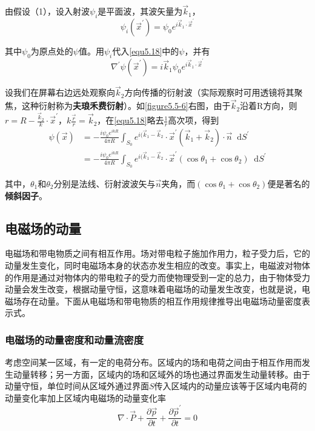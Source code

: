\documentclass[UTF8]{ctexart}
\newcommand*{\dif}{\mathop{}\!\mathrm{d}}
\begin{document}
    由假设（1），设入射波$\psi_i$是平面波，其波矢量为$\vec{k}_1$，
    \begin{equation}
        \psi_i(\vec{x}^{\prime}) = \psi_0 e^{i\vec{k}_1 \cdot \vec{x}^{\prime}}
    \end{equation}

\noindent 其中$\psi_0$为原点处的$\psi$值。用$\psi_i$代入\autoref{equ5.18}中的$\psi$，并有
\begin{equation}
    \nabla^{\prime} \psi(\vec{x}^{\prime}) = i \vec{k}_1 \psi_0 e^{i \vec{k}_1 \cdot \vec{x}^{\prime}}
\end{equation}

    设我们在屏幕右边远处观察向$\vec{k}_2$方向传播的衍射波（实际观察时可用透镜将其聚焦，这种衍射称为\textbf{夫琅禾费衍射}）。如\autoref{figure5.5-6}右图，由于$\vec{k}_2$沿着R方向，则$r = R - \frac{\vec{k}_2}{k} \cdot \vec{x}^{\prime}$，$k \frac{\vec{r}}{r} = \vec{k}_2$，在\autoref{equ5.18}略去$\frac{1}{r}$高次项，得到
    \begin{equation}
        \begin{aligned}
            \psi(\vec{x}) &=- \frac{i \psi_0 e^{ikR}}{4 \pi R} \int_{S_0} e^{i(\vec{k}_1 - \vec{k}_2} \cdot \vec{x}^{\prime}(\vec{k}_1 + \vec{k}_2) \cdot \vec{n} \dif S^{\prime} \\
            &=- \frac{i \psi_0 e^{ikR}}{4 \pi R} \int_{S_0} e^{i(\vec{k}_1 - \vec{k}_2} \cdot \vec{x}^{\prime} (\cos \theta_1 + \cos \theta_2) \dif S^{\prime}
        \end{aligned}
    \end{equation}

\noindent 其中，$\theta_1$和$\theta_2$分别是法线、衍射波波矢与$\vec{n}$夹角，而$(\cos \theta_1 + \cos \theta_2)$便是著名的\textbf{倾斜因子}。

    \subsection{电磁场的动量}
    电磁场和带电物质之间有相互作用。场对带电粒子施加作用力，粒子受力后，它的动量发生变化，同时电磁场本身的状态亦发生相应的改变。事实上，电磁波对物体的作用是通过对物体内的带电粒子的受力而使物理受到一定的总力，由于物体受力动量会发生改变，根据动量守恒，这意味着电磁场的动量发生改变，也就是说，电磁场存在动量。下面从电磁场和带电物质的相互作用规律推导出电磁场动量密度表示式。

    \subsubsection{电磁场的动量密度和动量流密度}
    考虑空间某一区域，有一定的电荷分布。区域内的场和电荷之间由于相互作用而发生动量转移；另一方面，区域内的场和区域外的场也通过界面发生动量转移。由于动量守恒，单位时间从区域外通过界面$S$传入区域内的动量应该等于区域内电荷的动量变化率加上区域内电磁场的动量变化率
    \begin{equation}
        \nabla \cdot \vec{P} + \frac{\partial \vec{p}}{\partial t} + \frac{\partial \vec{p}^{\prime}}{\partial t} =0
    \end{equation}
\end{document}
